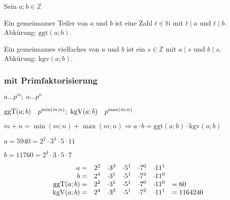 Sein $a;b \in \mathbb{Z}$

Ein gemeinsamer Teiler von $a$ und $b$ ist eine Zahl $t \in \mathbb{N}$ mit $t \mid a$ und $t \mid b$. Abkürung: $\textrm{ggt}(a;b)$.

Ein gemeinsames vielfaches von $a$ und $b$ ist ein $s \in \mathbb{Z}$ mit $a \mid s$ und $b \mid s$. Abkürung: $\textrm{kgv}(a;b)$.

\subsubsection{mit Primfaktorisierung}
$a \dots p^m;\ a \dots p^n$

$\ggt(a;b)\quad p^{\min(m;n)};\ \kgv(a;b)\quad p^{\max(m;n)}$

$m + n = \min(m;n) + \max(m;n) \Rightarrow a \cdot b = \textrm{ggt}(a;b) \cdot \textrm{kgv}(a;b)$

$a = 5940 = 2^2 \cdot 3^3 \cdot 5 \cdot 11$

$b = 11760 = 2^4 \cdot 3 \cdot 5 \cdot 7$

$$\begin{array}{rcccccl}
      a =         & 2^2 & \cdot 3^3 & \cdot 5^1 & \cdot 7^0 & \cdot 11^1             \\
      b =         & 2^4 & \cdot 3^1 & \cdot 5^1 & \cdot 7^2 & \cdot 11^0             \\
      \operatorname{ggT}(a;b) = & 2^2 & \cdot 3^1 & \cdot 5^1 & \cdot 7^0 & \cdot 11^0 & = 60      \\
      \operatorname{kgV}(a;b) = & 2^4 & \cdot 3^3 & \cdot 5^1 & \cdot 7^2 & \cdot 11^1 & = 1164240
\end{array}$$
